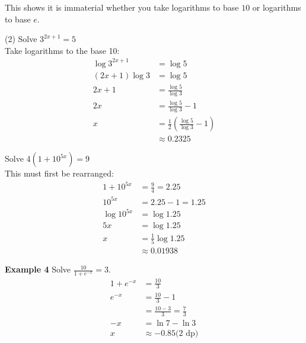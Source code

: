This shows it is immaterial whether you take logarithms to base $10$ or logarithms to base $e$. 
\begin{tasks}[label-width={6em}](2)
\task[Example 2]
Solve $3^{2 x +1} =5$\\
\solution Take logarithms to the base 10:
\begin{align*}\log  3^{2 x +1} &  = \log  5 \\
\left (2 x +1\right ) \log  3 &  = \log  5 \\
2 x +1 &  = \frac{\log  5}{\log  3} \\
2 x &  = \frac{\log  5}{\log  3} -1 \\
x &  = \frac{1}{2} \left (\frac{\log  5}{\log  3} -1\right ) \\
&  \approx 0.2325 \end{align*}

\task[Example 3]
Solve $4 \left (1 +10^{5 x}\right ) =9$\\
\solution This must first be rearranged:
\begin{align*}1 +10^{5 x} &  = \frac{9}{4} =2.25 \\
10^{5 x} &  = 2.25 -1 =1.25 \\
\log  10^{5 x} &  = \log  1.25 \\
5 x &  = \log  1.25 \\
x &  = \frac{1}{5} \log  1.25 \\
&  \approx 0.01938 \end{align*}
\end{tasks}

\textbf{Example 4} Solve $\frac{10}{1 +e^{ -x}} =3$.\medskip\\
\solution
\begin{align*}1 +e^{ -x} &  = \frac{10}{3} \\
e^{ -x} &  = \frac{10}{3} -1 \\
&  = \frac{10 -3}{3} =\frac{7}{3} \\
-x &  = \ln  7 -\ln  3 \\
x &  \approx  -0.85\text{(2 dp)}\end{align*}


